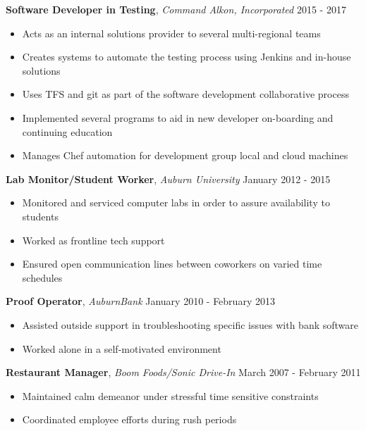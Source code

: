 \documentclass[9pt]{article}
\newenvironment{changemargin}[2]{%
  \begin{list}{}{%
    \setlength{\topsep}{0pt}%
    \setlength{\leftmargin}{#1}%
    \setlength{\rightmargin}{#2}%
    \setlength{\listparindent}{\parindent}%
    \setlength{\itemindent}{\parindent}%
    \setlength{\parsep}{\parskip}%
  }%
  \item[]}{\end{list}
}
\newenvironment{body} {
	\vspace*{-16pt}
	\begin{changemargin}{-0.25in}{-0.5in}
  }	
	{\end{changemargin}
}
\begin{document}
\begin{body}
	\vspace{17pt}
	\textbf{Software Developer in Testing}, \emph{Command Alkon, Incorporated} \hfill 2015 - 2017 \\
	\vspace*{-4pt}
	\begin{itemize} \itemsep -0pt  %
		\item Acts as an internal solutions provider to several multi-regional teams
		\item Creates systems to automate the testing process using Jenkins and in-house solutions
		\item Uses TFS and git as part of the software development collaborative process
		\item Implemented several programs to aid in new developer on-boarding and continuing education
		\item Manages Chef automation for development group local and cloud machines
	\end{itemize}
	\vspace{17pt}

	\textbf{Lab Monitor/Student Worker}, \emph{Auburn University} \hfill January 2012 - 2015\\
	\vspace*{-4pt}
	\begin{itemize} \itemsep -0pt  %
		\item Monitored and serviced computer labs in order to assure availability to students
		\item Worked as frontline tech support
		\item Ensured open communication lines between coworkers on varied time schedules
	\end{itemize}
	\vspace{17pt}

	\textbf{Proof Operator}, \emph{AuburnBank} \hfill January 2010 - February 2013 \\
	\vspace*{-4pt}
	\begin{itemize} \itemsep -0pt  %
		\item Assisted outside support in troubleshooting specific issues with bank software
		\item Worked alone in a self-motivated environment
	\end{itemize}
	\vspace{17pt}

	\textbf {Restaurant Manager}, \emph{Boom Foods/Sonic Drive-In} \hfill March 2007 - February 2011\\
	\vspace*{-4pt}
	\begin{itemize} \itemsep -0pt
		\item Maintained calm demeanor under stressful time sensitive constraints
		\item Coordinated employee efforts during rush periods
	\end{itemize}
\end{body}
\end{document}
